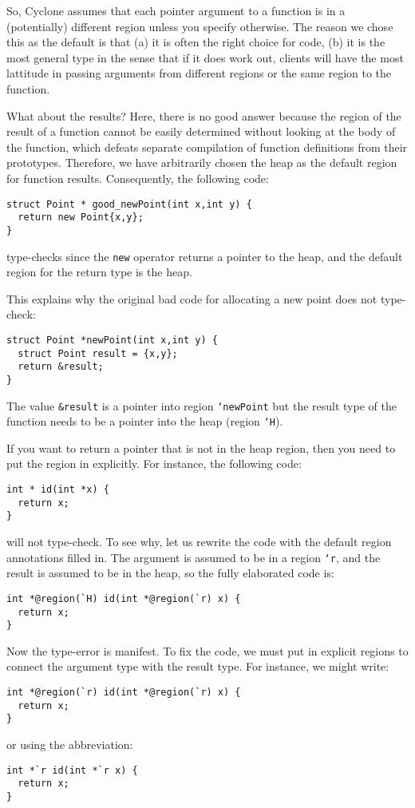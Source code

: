 So, Cyclone assumes that each pointer argument to a function is
in a (potentially) different region unless you specify otherwise.
The reason we chose this as the default is that (a) it is often
the right choice for code, (b) it is the most general type in
the sense that if it does work out, clients will have the most
lattitude in passing arguments from different regions or the
same region to the function.  

What about the results?  Here, there is no good answer because
the region of the result of a function cannot be easily determined
without looking at the body of the function, which defeats separate
compilation of function definitions from their prototypes.  Therefore,
we have arbitrarily chosen the heap as the default region for
function results.  Consequently, the following code:
\begin{verbatim}
struct Point * good_newPoint(int x,int y) {
  return new Point{x,y};
}
\end{verbatim}
type-checks since the \texttt{new} operator returns a pointer
to the heap, and the default region for the return type is the heap.

This explains why the original bad code for allocating a new
point does not type-check:
\begin{verbatim}
struct Point *newPoint(int x,int y) {
  struct Point result = {x,y};
  return &result;
}
\end{verbatim}
The value \texttt{\&result} is a pointer into region \texttt{`newPoint}
but the result type of the function needs to be a pointer into
the heap (region \texttt{`H}).  

If you want to return a pointer that is not in the heap region,
then you need to put the region in explicitly.  For instance,
the following code:
\begin{verbatim}
int * id(int *x) {
  return x;
}
\end{verbatim}
will not type-check.  To see why, let us rewrite the
code with the default region annotations filled in.  The argument
is assumed to be in a region \texttt{`r}, and the result is assumed to be
in the heap, so the fully elaborated code is:
\begin{verbatim}
int *@region(`H) id(int *@region(`r) x) {
  return x;
}
\end{verbatim}
Now the type-error is manifest.  To fix the code, we must put in
explicit regions to connect the argument type with the result type.
For instance, we might write:
\begin{verbatim}
int *@region(`r) id(int *@region(`r) x) {
  return x;
}
\end{verbatim}
or using the abbreviation:
\begin{verbatim}
int *`r id(int *`r x) {
  return x;
}
\end{verbatim}

